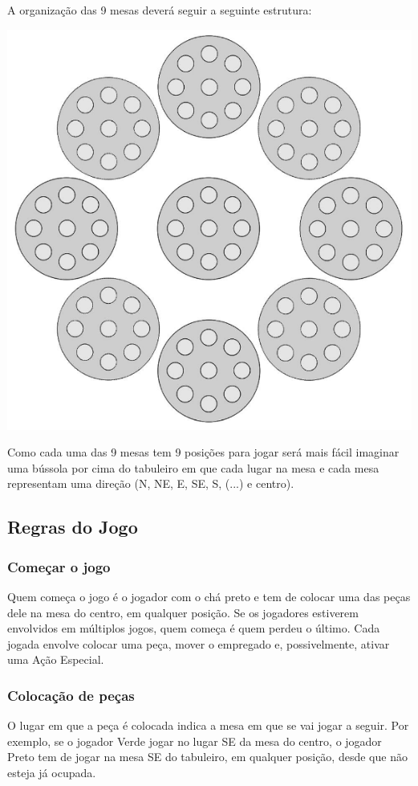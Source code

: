 \documentclass[a4paper]{article}
\begin{document}
A organização das 9 mesas deverá seguir a seguinte estrutura: \newline
\begin{center}
\includegraphics[scale=0.5]{board-setup.png}\newline
\end{center}

Como cada uma das 9 mesas tem 9 posições para jogar será mais fácil imaginar uma bússola por cima do tabuleiro em que cada lugar na mesa e cada mesa representam uma direção (N, NE, E, SE, S, (...) e centro). 

\subsection{Regras do Jogo}
\subsubsection{Começar o jogo}
Quem começa o jogo é o jogador com o chá preto e tem de colocar uma das peças dele na mesa do centro, em qualquer posição. Se os jogadores estiverem envolvidos em múltiplos jogos, quem começa é quem perdeu o último. Cada jogada envolve colocar uma peça, mover o empregado e, possivelmente, ativar uma Ação Especial.

\subsubsection{Colocação de peças}
O lugar em que a peça é colocada indica a mesa em que se vai jogar a seguir. Por exemplo, se o jogador Verde jogar no lugar SE da mesa do centro, o jogador Preto tem de jogar na mesa SE do tabuleiro, em qualquer posição, desde que não esteja já ocupada.
\end{document}
